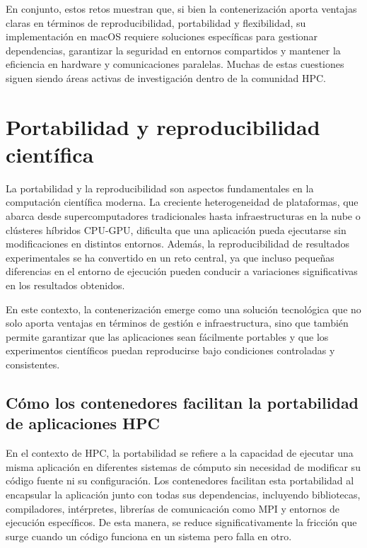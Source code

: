 En conjunto, estos retos muestran que, si bien la contenerización aporta ventajas claras en términos de reproducibilidad, portabilidad y flexibilidad, su implementación en macOS requiere soluciones específicas para gestionar dependencias, garantizar la seguridad en entornos compartidos y mantener la eficiencia en hardware y comunicaciones paralelas. Muchas de estas cuestiones siguen siendo áreas activas de investigación dentro de la comunidad HPC.

\section{Portabilidad y reproducibilidad científica}\label{sec:portabilidad_reproducibilidad}

La portabilidad y la reproducibilidad son aspectos fundamentales en la computación científica moderna. La creciente heterogeneidad de plataformas, que abarca desde supercomputadores tradicionales hasta infraestructuras en la nube o clústeres híbridos CPU-GPU, dificulta que una aplicación pueda ejecutarse sin modificaciones en distintos entornos. Además, la reproducibilidad de resultados experimentales se ha convertido en un reto central, ya que incluso pequeñas diferencias en el entorno de ejecución pueden conducir a variaciones significativas en los resultados obtenidos.

En este contexto, la contenerización emerge como una solución tecnológica que no solo aporta ventajas en términos de gestión e infraestructura, sino que también permite garantizar que las aplicaciones sean fácilmente portables y que los experimentos científicos puedan reproducirse bajo condiciones controladas y consistentes.

\subsection{Cómo los contenedores facilitan la portabilidad de aplicaciones HPC}

En el contexto de \acs{HPC}, la portabilidad se refiere a la capacidad de ejecutar una misma aplicación en diferentes sistemas de cómputo sin necesidad de modificar su código fuente ni su configuración. Los contenedores facilitan esta portabilidad al encapsular la aplicación junto con todas sus dependencias, incluyendo bibliotecas, compiladores, intérpretes, librerías de comunicación como MPI y entornos de ejecución específicos. De esta manera, se reduce significativamente la fricción que surge cuando un código funciona en un sistema pero falla en otro.

